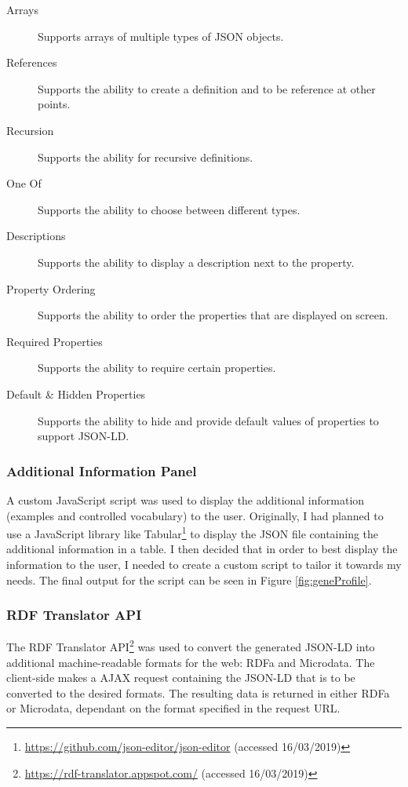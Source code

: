 {
\begin{description}
  \item[Arrays]
  Supports arrays of multiple types of JSON objects.
  \item[References] 
  Supports the ability to create a definition and to be reference at other points.
  \item[Recursion]
  Supports the ability for recursive definitions.
  \item[One Of]
  Supports the ability to choose between different types.
  \item[Descriptions]
  Supports the ability to display a description next to the property.
  \item[Property Ordering]
  Supports the ability to order the properties that are displayed on screen.
  \item[Required Properties]
  Supports the ability to require certain properties.
  \item[Default \& Hidden Properties]
  Supports the ability to hide and provide default values of properties to support JSON-LD.
\end{description}
}

\subsubsection{Additional Information Panel} \label{sec:additionalinformation}
A custom JavaScript script was used to display the additional information (examples and controlled vocabulary) to the user. Originally, I had planned to use a JavaScript library like Tabular\footnote{\url{https://github.com/json-editor/json-editor} (accessed 16/03/2019)} to display the JSON file containing the additional information in a table. I then decided that in order to best display the information to the user, I needed to create a custom script to tailor it towards my needs. The final output for the script can be seen in Figure \ref{fig:geneProfile}.

\subsubsection{RDF Translator API}
The RDF Translator API\footnote{\url{https://rdf-translator.appspot.com/} (accessed 16/03/2019)} was used to convert the generated JSON-LD into additional machine-readable formats for the web: RDFa and Microdata. The client-side makes a AJAX request containing the JSON-LD that is to be converted to the desired formats. The resulting data is returned in either RDFa or Microdata, dependant on the format specified in the request URL. 

